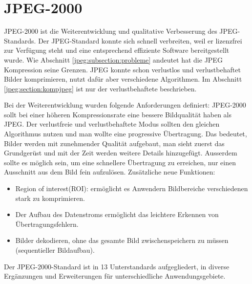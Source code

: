 %
%
%
%
\section{JPEG-2000 
\label{jpeg:section:jpeg2000}}
JPEG-2000 ist die Weiterentwicklung und qualitative Verbesserung des JPEG-Standards.
Der JPEG-Standard konnte sich schnell verbreiten, weil er lizenzfrei zur Verfügung steht und eine entsprechend effiziente Software bereitgestellt wurde.
Wie Abschnitt \ref{jpeg:subsection:probleme} andeutet hat die JPEG Kompression seine Grenzen.
JPEG konnte schon verlustlos und verlustbehaftet Bilder komprimieren, nutzt dafür aber verschiedene Algorithmen.
Im Abschnitt \ref{jpeg:section:kompjpeg} ist nur der verlustbehaftete beschrieben.

Bei der Weiterentwicklung wurden folgende Anforderungen definiert:
JPEG-2000 sollt bei einer höheren Kompressionsrate eine bessere Bildqualität haben als JPEG.
Der verlustfreie und verlustbehaftete Modus sollten den gleichen Algorithmus nutzen und man wollte eine progressive Übertragung.
Das bedeutet, Bilder werden mit zunehmender Qualität aufgebaut, man sieht zuerst das Grundgerüst und mit der Zeit werden weitere Details hinzugefügt.
Ausserdem sollte es möglich sein, um eine schnellere Übertragung zu erreichen, nur einen Ausschnitt aus dem Bild fein aufzulösen.
Zusätzliche neue Funktionen:
\begin{itemize}
    \item Region of interest(ROI): ermöglicht es Anwendern Bildbereiche verschiedenen stark zu komprimieren.
    \item Der Aufbau des Datenstroms ermöglicht das leichtere Erkennen von Übertragungsfehlern.
    \item Bilder dekodieren, ohne das gesamte Bild zwischenspeichern zu müssen (sequentieller Bildaufbau).
\end{itemize}
Der JPEG-2000-Standard ist in 13 Unterstandards aufgegliedert, in diverse Ergänzungen und Erweiterungen für unterschiedliche Anwendungsgebiete. 


